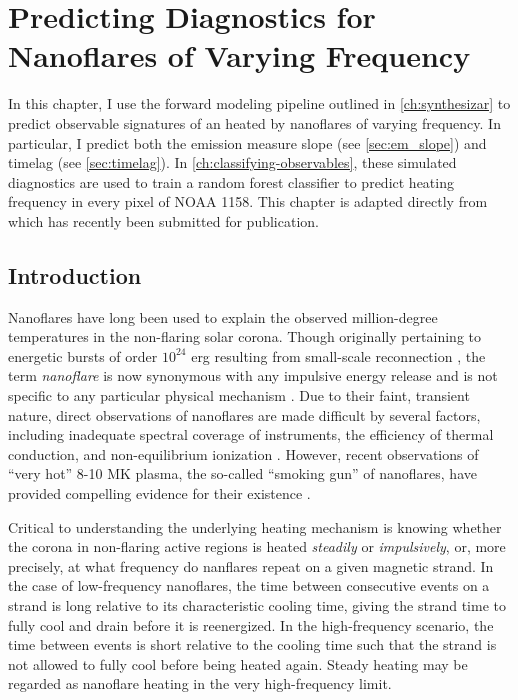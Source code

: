 \chapter{Predicting Diagnostics for Nanoflares of Varying Frequency}\label{ch:modeling-observables}
\thispagestyle{firstpageofchapterstyle}

In this chapter, I use the forward modeling pipeline outlined in \autoref{ch:synthesizar} to predict observable signatures of an \AR{} heated by nanoflares of varying frequency. In particular, I predict both the emission measure slope (see \autoref{sec:em_slope}) and timelag (see \autoref{sec:timelag}). In \autoref{ch:classifying-observables}, these simulated diagnostics are used to train a random forest classifier to predict heating frequency in every pixel of \AR{} NOAA 1158. This chapter is adapted directly from \citet{barnes_understanding_2019} which has recently been submitted for publication. 

\section{Introduction}\label{sec:modeling-observables:introduction}

Nanoflares have long been used to explain the observed million-degree temperatures in the non-flaring solar corona. Though originally pertaining to energetic bursts of order $10^{24}$ erg resulting from small-scale reconnection \citep{parker_nanoflares_1988}, the term \textit{nanoflare} is now synonymous with any impulsive energy release and is not specific to any particular physical mechanism \citep{klimchuk_key_2015}. Due to their faint, transient nature, direct observations of nanoflares are made difficult by several factors, including inadequate spectral coverage of instruments, the efficiency of thermal conduction, and non-equilibrium ionization \citep{cargill_implications_1994,winebarger_defining_2012,barnes_inference_2016}. However, recent observations of ``very hot'' 8-10 MK plasma, the so-called ``smoking gun'' of nanoflares, have provided compelling evidence for their existence \citep[e.g.][]{brosius_pervasive_2014,caspi_new_2015,parenti_spectroscopy_2017,ishikawa_detection_2017}.

Critical to understanding the underlying heating mechanism is knowing whether the corona in non-flaring active regions is heated \textit{steadily} or \textit{impulsively}, or, more precisely, at what frequency do nanflares repeat on a given magnetic strand. In the case of low-frequency nanoflares, the time between consecutive events on a strand is long relative to its characteristic cooling time, giving the strand time to fully cool and drain before it is reenergized. In the high-frequency scenario, the time between events is short relative to the cooling time such that the strand is not allowed to fully cool before being heated again. Steady heating may be regarded as nanoflare heating in the very high-frequency limit.

